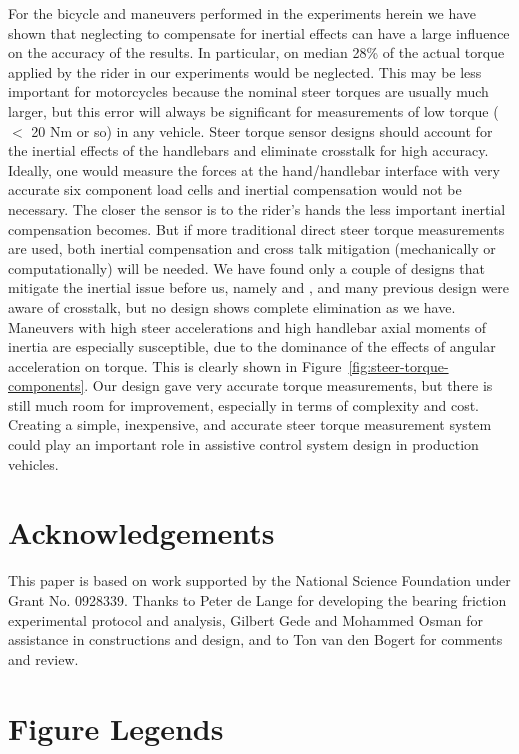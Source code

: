 \documentclass[10pt]{article}
\begin{document}
For the bicycle and maneuvers performed in the experiments herein we have shown
that neglecting to compensate for inertial effects can have a large influence
on the accuracy of the results. In particular, on median 28\% of the actual
torque applied by the rider in our experiments would be neglected. This may be
less important for motorcycles because the nominal steer torques are usually
much larger, but this error will always be significant for measurements of low
torque ($<$ 20 Nm or so) in any vehicle. Steer torque sensor designs should
account for the inertial effects of the handlebars and eliminate crosstalk for
high accuracy. Ideally, one would measure the forces at the hand/handlebar
interface with very accurate six component load cells and inertial compensation
would not be necessary. The closer the sensor is to the rider's hands the less
important inertial compensation becomes. But if more traditional direct steer
torque measurements are used, both inertial compensation and cross talk
mitigation (mechanically or computationally) will be needed. We have found only
a couple of designs that mitigate the inertial issue before us, namely
\cite{Evertse2010} and \cite{Iuchi2006}, and many previous design were aware of
crosstalk, but no design shows complete elimination as we have. Maneuvers with
high steer accelerations and high handlebar axial moments of inertia are
especially susceptible, due to the dominance of the effects of angular
acceleration on torque. This is clearly shown in
Figure~\ref{fig:steer-torque-components}. Our design gave very accurate torque
measurements, but there is still much room for improvement, especially in terms
of complexity and cost. Creating a simple, inexpensive, and accurate steer
torque measurement system could play an important role in assistive control
system design in production vehicles.

\section*{Acknowledgements}

This paper is based on work supported by the National Science Foundation under
Grant No. 0928339. Thanks to Peter de Lange for developing the bearing friction
experimental protocol and analysis, Gilbert Gede and Mohammed Osman for
assistance in constructions and design, and to Ton van den Bogert for comments
and review.




\section*{Figure Legends}
\end{document}
